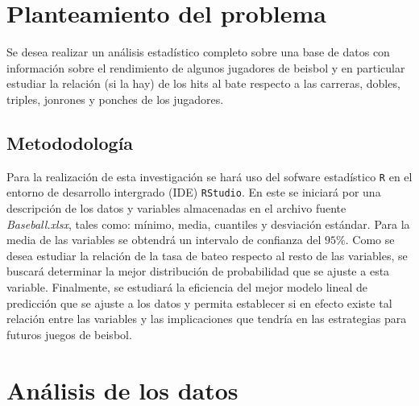 \documentclass{staprojteamusb}
\begin{document}
	
	
	\maketitle
	
	
	
	\hypertarget{planteamiento-del-problema}{%
 \section{Planteamiento del problema}\label{planteamiento-del-problema}}

 Se desea realizar un análisis estadístico completo sobre una base de datos con información sobre el rendimiento de algunos jugadores de beisbol y en particular estudiar la relación (si la hay) de los hits al bate respecto a las carreras, dobles, triples, jonrones y ponches de los jugadores.

 \hypertarget{metododologuxeda}{%
 \subsection{Metododología}\label{metododologuxeda}}

 Para la realización de esta investigación se hará uso del sofware estadístico \texttt{R} en el entorno de desarrollo intergrado (IDE) \texttt{RStudio}. En este se iniciará por una descripción de los datos y variables almacenadas en el archivo fuente \emph{Baseball.xlsx}, tales como: mínimo, media, cuantiles y desviación estándar. Para la media de las variables se obtendrá un intervalo de confianza del \(95\%\). Como se desea estudiar la relación de la tasa de bateo respecto al resto de las variables, se buscará determinar la mejor distribución de probabilidad que se ajuste a esta variable. Finalmente, se estudiará la eficiencia del mejor modelo lineal de predicción que se ajuste a los datos y permita establecer si en efecto existe tal relación entre las variables y las implicaciones que tendría en las estrategias para futuros juegos de beisbol.

 \hypertarget{anuxe1lisis-de-los-datos}{%
 \section{Análisis de los datos}\label{anuxe1lisis-de-los-datos}}
\end{document}
